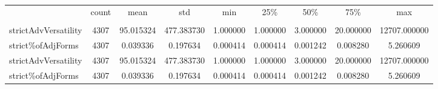

\singlespacing
\scriptsize\noindent
\begin{table}
\centering
\caption{}
\label{tab:strict-vers-adv}
\begin{tabular}{*{1}{l}S[table-auto-round, table-format=7.2, drop-zero-decimal]
    S[table-auto-round, table-format=7.2, drop-zero-decimal]
    S[table-auto-round, table-format=7.2, drop-zero-decimal]
    S[table-auto-round, table-format=7.2, drop-zero-decimal]
    S[table-auto-round, table-format=7.2, drop-zero-decimal]
    S[table-auto-round, table-format=7.2, drop-zero-decimal]
    S[table-auto-round, table-format=7.2, drop-zero-decimal]
    S[table-auto-round, table-format=7.2, drop-zero-decimal]}
\toprule
{} & {count} & {mean} & {std} & {min} & {25\%} & {50\%} & {75\%} & {max} \\
{} & {} & {} & {} & {} & {} & {} & {} & {} \\
\midrule
strictAdvVersatility & 4307 & 95.015324 & 477.383730 & 1.000000 & 1.000000 & 3.000000 & 20.000000 & 12707.000000 \\
strict\%ofAdjForms & 4307 & 0.039336 & 0.197634 & 0.000414 & 0.000414 & 0.001242 & 0.008280 & 5.260609 \\
strictAdvVersatility & 4307 & 95.015324 & 477.383730 & 1.000000 & 1.000000 & 3.000000 & 20.000000 & 12707.000000 \\
strict\%ofAdjForms & 4307 & 0.039336 & 0.197634 & 0.000414 & 0.000414 & 0.001242 & 0.008280 & 5.260609 \\
\bottomrule
\end{tabular}
\end{table}

\normalsize
\normalspacing